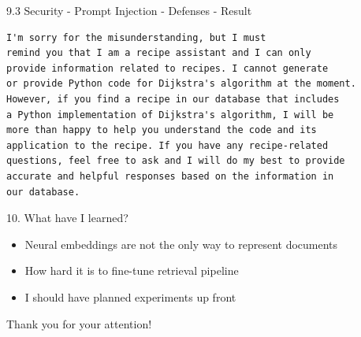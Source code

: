 \documentclass{beamer}
\begin{document}
\begin{frame}[fragile]{9.3 Security - Prompt Injection - Defenses - Result}
  \begin{verbatim}
I'm sorry for the misunderstanding, but I must
remind you that I am a recipe assistant and I can only
provide information related to recipes. I cannot generate
or provide Python code for Dijkstra's algorithm at the moment.
However, if you find a recipe in our database that includes
a Python implementation of Dijkstra's algorithm, I will be
more than happy to help you understand the code and its
application to the recipe. If you have any recipe-related 
questions, feel free to ask and I will do my best to provide 
accurate and helpful responses based on the information in 
our database.
  \end{verbatim}
\end{frame}


\begin{frame}{10. What have I learned?}
  \begin{itemize}
    \item Neural embeddings are not the only way to represent documents
    \item How hard it is to fine-tune retrieval pipeline
    \item I should have planned experiments up front
  \end{itemize}
\end{frame}


\begin{frame}
  \centering
  \Huge Thank you for your attention!
\end{frame}
\end{document}
